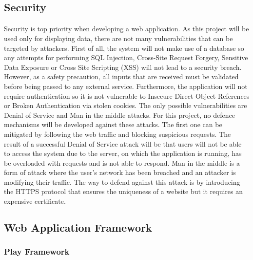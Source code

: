 \documentclass{l4proj}
\begin{document}
\subsection{Security}
\paragraph{}
Security is top priority when developing a web application. As this project will be used only for displaying data, there are not many vulnerabilities that can be targeted by attackers. First of all, the system will not make use of a database so any attempts for performing SQL Injection, Cross-Site Request Forgery, Sensitive Data Exposure or Cross Site Scripting (XSS) will not lead to a security breach. However, as a safety precaution, all inputs that are received must be validated before being passed to any external service. Furthermore, the application will not require authentication so it is not vulnerable to Insecure Direct Object References or Broken Authentication via stolen cookies. The only possible vulnerabilities are Denial of Service and Man in the middle attacks. For this project, no defence mechanisms will be developed against these attacks. The first one can be mitigated by following the web traffic and blocking suspicious requests. The result of a successful Denial of Service attack will be that users will not be able to access the system due to the server, on which the application is running, has be overloaded with requests and is not able to respond. Man in the middle is a form of attack where the user's network has been breached and an attacker is modifying their traffic. The way to defend against this attack is by introducing the HTTPS protocol that ensures the uniqueness of a website but it requires an expensive certificate.    

\subsection{Web Application Framework}

\subsubsection{Play Framework}
\end{document}
